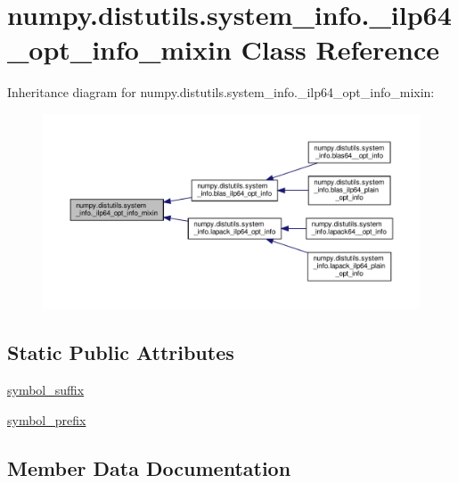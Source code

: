 \hypertarget{classnumpy_1_1distutils_1_1system__info_1_1__ilp64__opt__info__mixin}{}\section{numpy.\+distutils.\+system\+\_\+info.\+\_\+ilp64\+\_\+opt\+\_\+info\+\_\+mixin Class Reference}
\label{classnumpy_1_1distutils_1_1system__info_1_1__ilp64__opt__info__mixin}


Inheritance diagram for numpy.\+distutils.\+system\+\_\+info.\+\_\+ilp64\+\_\+opt\+\_\+info\+\_\+mixin\+:
\nopagebreak
\begin{figure}[H]
\begin{center}
\leavevmode
\includegraphics[width=350pt]{classnumpy_1_1distutils_1_1system__info_1_1__ilp64__opt__info__mixin__inherit__graph}
\end{center}
\end{figure}
\subsection*{Static Public Attributes}
\begin{DoxyCompactItemize}
\item 
\hyperlink{classnumpy_1_1distutils_1_1system__info_1_1__ilp64__opt__info__mixin_a2c686ff2ff8eb56351e81768fd8e6bed}{symbol\+\_\+suffix}
\item 
\hyperlink{classnumpy_1_1distutils_1_1system__info_1_1__ilp64__opt__info__mixin_ac9af22d6b0cf0cc06b27509c7330c4b2}{symbol\+\_\+prefix}
\end{DoxyCompactItemize}


\subsection{Member Data Documentation}
\mbox{\label{classnumpy_1_1distutils_1_1system__info_1_1__ilp64__opt__info__mixin_ac9af22d6b0cf0cc06b27509c7330c4b2}} 
